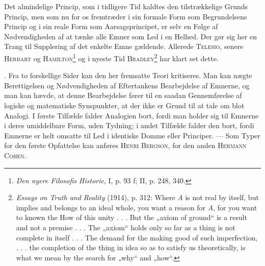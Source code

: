 \documentclass[12pt]{article}
\begin{document}
Det almindelige Princip, som i tidligere Tid kaldtes den tilstrækkelige Grunds
Princip, men som nu for os fremtræder i sin formale Form som Begrundelsens
Princip og i sin reale Form som Aarsagsprincipet, er selv en Følge af
Nødvendigheden af at tænke alle Emner som Led i en Helhed. Der gør sig her en
Trang til Supplering af det enkelte Emne gældende. Allerede \textsc{Telesio},
senere \textsc{Herbart} og \textsc{Hamilton}\footnote{%
\textit{Den nyere
Filosofis Historie}, I, p. 93 f;
II, p. 248, 340.} og i nyeste Tid \textsc{Bradley}\footnote{\textit{Essays on
Truth and Reality} (1914), p. 312: Where \textit{A} is not real by itself, but
implies and belongs to an ideal whole, you want a reason for \textit{A}, for you
want to
known the How of this unity . . . But the „axiom of ground“ is a result and not
a premise . . . The „axiom“ holds only so far as a thing is not complete in
itself . . . The demand for the making good of such imperfection, . . . the
completion of the thing in idea so as to satisfy us theoretically, is what we
mean by the search for „why“ and „how“.} har klart set dette.

. Fra to forskellige Sider kan den her fremsatte Teori kritiseres. Man kan
nægte Berettigelsen og Nødvendigheden af Eftertankens Bearbejdelse af Emnerne,
og man kan hævde, at denne Bearbejdelse fører til en saadan Gennemførelse af
logiske og matematiske Synspunkter, at der ikke er Grund til at tale om blot
Analogi. I første Tilfælde falder Analogien bort, fordi man holder sig til
Emnerne i deres umiddelbare Form, uden Tydning; i andet Tilfælde falder den
bort, fordi Emnerne er helt omsatte til Led i identiske Domme eller Principer.
--- Som Typer for den første Opfattelse kan anføres \textsc{Henri Bergson}, for
den anden \textsc{Hermann Cohen}.
\end{document}
